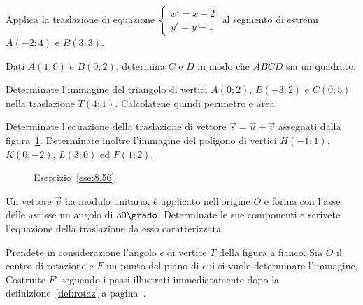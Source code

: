 \begin{esercizio}
\label{ese:8.53} %
Applica la traslazione di equazione 
$\begin{cases}x'=x+2\\y'=y-1\end{cases}$ al segmento di estremi 
$A(-2;4)$ e $B(3;3)$. 
\end{esercizio}

\begin{esercizio}
\label{ese:8.54} %
Dati $A(1;0)$ e $B(0;2)$, determina $C$ e $D$ in modo che $ABCD$ sia 
un quadrato.
\end{esercizio}

\begin{esercizio}
\label{ese:8.55} %
Determinate l'immagine del triangolo di vertici $A(0;2)$, $B(-3;2)$ e 
$C(0;5)$ nella traslazione $T(4;1)$. Calcolatene quindi perimetro e 
area.
\end{esercizio}

\begin{esercizio}
\label{ese:8.56} %
Determinate l'equazione della traslazione di vettore 
$\vec{s}=\vec{u}+\vec{v}$ assegnati dalla figura~\ref{fig:ese8.56}. 
Determinate inoltre l'immagine del poligono di vertici $H(-1;1)$, 
$K(0;-2)$, $L(3;0)$ ed $F(1;2)$.
\end{esercizio}


\begin{inaccessibleblock}
 \begin{figure}[!htb]
	\centering
	\caption{Esercizio~\ref{ese:8.56}}\label{fig:ese8.56}
\end{figure}
\end{inaccessibleblock}\vspace{8pt}

\begin{esercizio}
\label{ese:8.57} %
Un vettore $\vec{v}$ ha modulo unitario, è applicato nell'origine $O$ 
e forma con l'asse delle ascisse un angolo di $30\grado$. Determinate 
le sue componenti e scrivete l'equazione della traslazione da esso 
caratterizzata.
\end{esercizio}

\noindent\begin{minipage}{0.7\textwidth}\parindent15pt
\begin{esercizio}
\label{ese:8.58} %
Prendete in considerazione l'angolo $\epsilon$ di vertice $T$ della 
figura a fianco. Sia $O$ il centro di rotazione e $F$ un punto del 
piano di cui si vuole determinare l'immagine. Costruite $F'$ seguendo 
i passi illustrati immediatamente dopo la definizione~\ref{def:rotaz} 
a pagina~\pageref{def:rotaz}.
\end{esercizio}
\end{minipage}\hfil
\begin{minipage}{0.3\textwidth}
	\centering~~
\end{minipage}\vspace{8pt}

